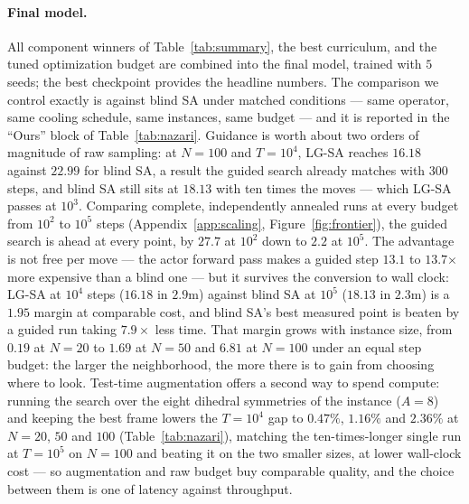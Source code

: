 \documentclass[letterpaper]{article} %
\begin{document}
\paragraph{Final model.}
All component winners of Table~\ref{tab:summary}, the best curriculum, and the tuned optimization budget are combined into the final model, trained with $5$ seeds; the best checkpoint provides the headline numbers. The comparison we control exactly is against blind SA under matched conditions --- same operator, same cooling schedule, same instances, same budget --- and it is reported in the ``Ours'' block of Table~\ref{tab:nazari}. Guidance is worth about two orders of magnitude of raw sampling: at $N = 100$ and $T = 10^{4}$, LG-SA reaches $16.18$ against $22.99$ for blind SA, a result the guided search already matches with $300$ steps, and blind SA still sits at $18.13$ with ten times the moves --- which LG-SA passes at $10^{3}$. Comparing complete, independently annealed runs at every budget from $10^{2}$ to $10^{5}$ steps (Appendix~\ref{app:scaling}, Figure~\ref{fig:frontier}), the guided search is ahead at every point, by $27.7$ at $10^{2}$ down to $2.2$ at $10^{5}$. The advantage is not free per move --- the actor forward pass makes a guided step $13.1$ to $13.7$$\times$ more expensive than a blind one --- but it survives the conversion to wall clock: LG-SA at $10^{4}$ steps ($16.18$ in $2.9$m) against blind SA at $10^{5}$ ($18.13$ in $2.3$m) is a $1.95$ margin at comparable cost, and blind SA's best measured point is beaten by a guided run taking $7.9\times$ less time. That margin grows with instance size, from $0.19$ at $N = 20$ to $1.69$ at $N = 50$ and $6.81$ at $N = 100$ under an equal step budget: the larger the neighborhood, the more there is to gain from choosing where to look. Test-time augmentation offers a second way to spend compute: running the search over the eight dihedral symmetries of the instance ($A = 8$) and keeping the best frame lowers the $T = 10^{4}$ gap to $0.47\%$, $1.16\%$ and $2.36\%$ at $N = 20$, $50$ and $100$ (Table~\ref{tab:nazari}), matching the ten-times-longer single run at $T = 10^{5}$ on $N = 100$ and beating it on the two smaller sizes, at lower wall-clock cost --- so augmentation and raw budget buy comparable quality, and the choice between them is one of latency against throughput.

\end{document}
